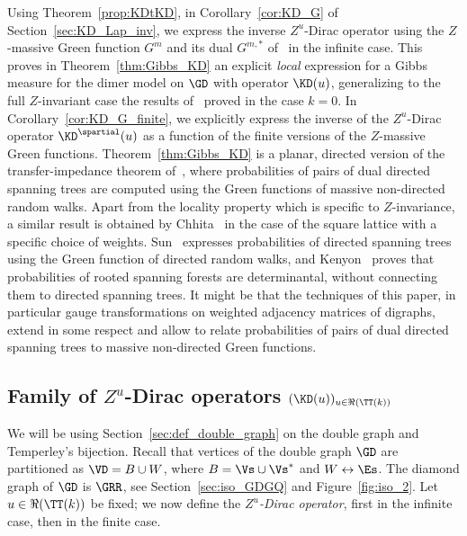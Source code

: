 \documentclass[a4paper,twoside,11pt]{article}
\begin{document}
Using Theorem~\ref{prop:KDtKD}, in Corollary~\ref{cor:KD_G} of Section~\ref{sec:KD_Lap_inv}, we express the inverse $Z^u$-Dirac operator
using the $Z$-massive Green function $G^m$ and its dual $G^{m,*}$ of~\cite{BdTR1} in the infinite case. This proves in Theorem~\ref{thm:Gibbs_KD}
an explicit \emph{local} expression for a Gibbs measure for the dimer model on $\GD$ with operator $\KD(u)$, generalizing 
to the full $Z$-invariant case the results of~\cite{Kenyon3} proved in the case $k=0$. In Corollary~\ref{cor:KD_G_finite}, we explicitly express the inverse of the 
$Z^u$-Dirac operator $\KD^\spartial(u)$ as a function of the finite versions of the $Z$-massive Green functions.
Theorem~\ref{thm:Gibbs_KD} is a planar, directed version of the transfer-impedance theorem of~\cite{BurtonPemantle},
where probabilities of pairs of dual directed spanning trees are computed using the Green functions of massive non-directed random walks. 
Apart from the locality property which is specific to $Z$-invariance,
a similar result is obtained by Chhita~\cite{Chhita} in the case of the square lattice with a specific choice of weights. 
Sun~\cite{Sun} expresses probabilities of directed spanning trees using the Green function of directed random walks, and Kenyon~\cite{Kenyon8}
proves that probabilities of rooted spanning forests are determinantal, without connecting them to directed spanning trees. It might 
be that the techniques of this paper, in particular gauge transformations on weighted adjacency matrices of digraphs, extend in some respect and 
allow to relate probabilities of pairs of dual directed spanning trees to massive non-directed Green functions.



\subsection{Family of $Z^u$-Dirac operators $(\KD(u))_{u\in\Re(\TT(k))}$}\label{sec:def_Dirac}

We will be using Section~\ref{sec:def_double_graph} on the double graph and Temperley's bijection.
Recall that vertices of the double graph $\GD$ are partitioned as 
$\VD=B\cup W$, where $B=\Vs\cup\Vs^*$ and $W\leftrightarrow \Es$. The diamond graph of $\GD$ is $\GRR$,
see Section~\ref{sec:iso_GDGQ} and Figure~\ref{fig:iso_2}. 
Let $u\in\Re(\TT(k))$ be fixed; we now define the \emph{$Z^u$-Dirac operator}, first in the infinite case, then in the finite case. 
\end{document}
